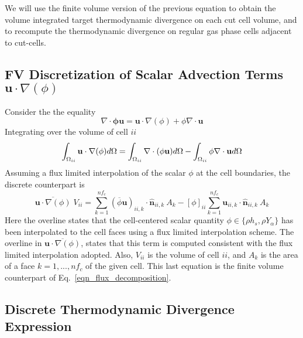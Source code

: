 We will use the finite volume version of the previous equation to obtain the volume integrated target thermodynamic divergence on each cut cell volume, and to recompute the thermodynamic divergence on regular gas phase cells adjacent to cut-cells.


\subsection{FV Discretization of Scalar Advection Terms $\mathbf{u} \cdot \nabla (\phi)$}

Consider the the equality
%
\begin{equation}
    \nabla \cdot \mathbf{\phi u} = \mathbf{u} \cdot \nabla (\phi) + \phi \nabla \cdot \mathbf{u} \label{eq:advforms}
\end{equation}
%
Integrating over the volume of cell $ii$
%
\begin{equation}
    \int_{\Omega_{ii}} {\mathbf{u} \cdot \nabla(\phi)} d\Omega =
    \int_{\Omega_{ii}} \nabla \cdot ({\phi} \mathbf{u}) d\Omega -
    \int_{\Omega_{ii}} \phi \nabla \cdot \mathbf{u} d\Omega \label{eq:flxlim1} \\
\end{equation}
Assuming a flux limited interpolation of the scalar $\phi$ at the cell boundaries, the discrete counterpart is
%
\begin{equation}
    \overline{\mathbf{u} \cdot \nabla(\phi)} \; V_{ii} =
    \sum_{k=1}^{nf_c} (\overline{\phi} \mathbf{u})_{ii,k} \cdot \hat{\mathbf{n}}_{ii,k} \: A_k -
    [\phi]_{ii} \sum_{k=1}^{nf_c} \mathbf{u}_{ii,k} \cdot \hat{\mathbf{n}}_{ii,k} \: A_k \label{eq:flxlim2}
\end{equation}
%
Here the overline states that the cell-centered scalar quantity $\phi \in \{\rho h_s, \rho Y_\alpha\}$ has been interpolated to the cell faces using a flux limited interpolation scheme. The overline in $\overline{\mathbf{u} \cdot \nabla(\phi)}$, states that this term is computed consistent with the flux limited interpolation adopted. Also, $V_{ii}$ is the volume of cell $ii$, and $A_k$ is the area of a face $k=1,...,nf_c$ of the given cell. This last equation is the finite volume counterpart of Eq.~\eqref{eqn_flux_decomposition}. %

\subsection{Discrete Thermodynamic Divergence Expression}

